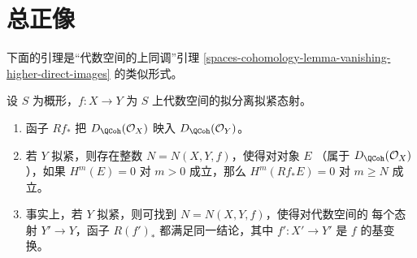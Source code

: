 \section{总正像}
\label{section-total-direct-image}

\noindent
下面的引理是“代数空间的上同调”引理
\ref{spaces-cohomology-lemma-vanishing-higher-direct-images} 的类似形式。

\begin{lemma}
\label{lemma-quasi-coherence-direct-image}
设 $S$ 为概形，$f : X \to Y$ 为 $S$ 上代数空间的拟分离拟紧态射。
\begin{enumerate}
\item 函子 $Rf_*$ 把 $D_\QCoh(\mathcal{O}_X)$ 映入
$D_\QCoh(\mathcal{O}_Y)$。
\item 若 $Y$ 拟紧，则存在整数 $N = N(X, Y, f)$，使得对对象 $E$
（属于 $D_\QCoh(\mathcal{O}_X)$），如果 $H^m(E) = 0$ 对
$m > 0$ 成立，那么 $H^m(Rf_*E) = 0$ 对 $m \geq N$ 成立。
\item 事实上，若 $Y$ 拟紧，则可找到 $N = N(X, Y, f)$，使得对代数空间的
每个态射 $Y' \to Y$，函子 $R(f')_*$ 都满足同一结论，其中
$f' : X' \to Y'$ 是 $f$ 的基变换。
\end{enumerate}
\end{lemma}

